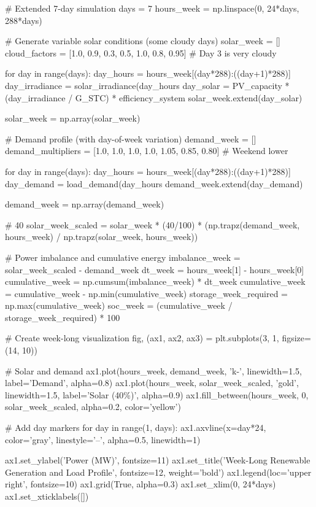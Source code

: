 \documentclass[11pt,a4paper]{article}
\begin{document}
\begin{pycode}
# Extended 7-day simulation
days = 7
hours_week = np.linspace(0, 24*days, 288*days)

# Generate variable solar conditions (some cloudy days)
solar_week = []
cloud_factors = [1.0, 0.9, 0.3, 0.5, 1.0, 0.8, 0.95]  # Day 3 is very cloudy

for day in range(days):
    day_hours = hours_week[(day*288):((day+1)*288)]
    day_irradiance = solar_irradiance(day_hours %
    day_solar = PV_capacity * (day_irradiance / G_STC) * efficiency_system
    solar_week.extend(day_solar)

solar_week = np.array(solar_week)

# Demand profile (with day-of-week variation)
demand_week = []
demand_multipliers = [1.0, 1.0, 1.0, 1.0, 1.05, 0.85, 0.80]  # Weekend lower

for day in range(days):
    day_hours = hours_week[(day*288):((day+1)*288)]
    day_demand = load_demand(day_hours %
    demand_week.extend(day_demand)

demand_week = np.array(demand_week)

# 40%
solar_week_scaled = solar_week * (40/100) * (np.trapz(demand_week, hours_week) /
                                               np.trapz(solar_week, hours_week))

# Power imbalance and cumulative energy
imbalance_week = solar_week_scaled - demand_week
dt_week = hours_week[1] - hours_week[0]
cumulative_week = np.cumsum(imbalance_week) * dt_week
cumulative_week = cumulative_week - np.min(cumulative_week)
storage_week_required = np.max(cumulative_week)
soc_week = (cumulative_week / storage_week_required) * 100

# Create week-long visualization
fig, (ax1, ax2, ax3) = plt.subplots(3, 1, figsize=(14, 10))

# Solar and demand
ax1.plot(hours_week, demand_week, 'k-', linewidth=1.5, label='Demand', alpha=0.8)
ax1.plot(hours_week, solar_week_scaled, 'gold', linewidth=1.5, label='Solar (40\%)', alpha=0.9)
ax1.fill_between(hours_week, 0, solar_week_scaled, alpha=0.2, color='yellow')

# Add day markers
for day in range(1, days):
    ax1.axvline(x=day*24, color='gray', linestyle='--', alpha=0.5, linewidth=1)

ax1.set_ylabel('Power (MW)', fontsize=11)
ax1.set_title('Week-Long Renewable Generation and Load Profile', fontsize=12, weight='bold')
ax1.legend(loc='upper right', fontsize=10)
ax1.grid(True, alpha=0.3)
ax1.set_xlim(0, 24*days)
ax1.set_xticklabels([])


\end{pycode}
\end{document}
